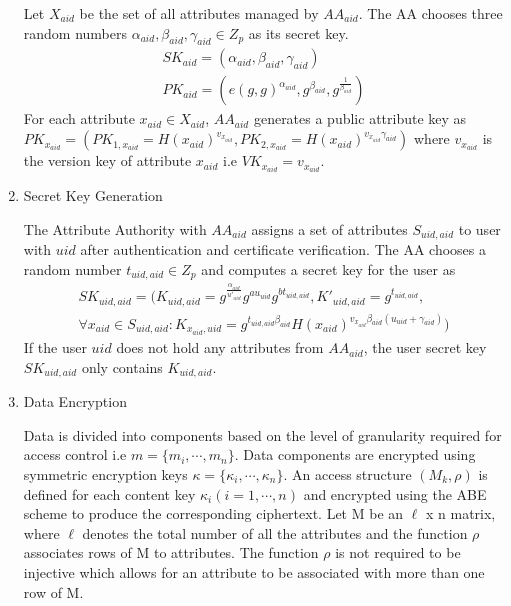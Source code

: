 \begin{enumerate}
	Let $ X_{aid} $ be the set of all attributes managed by $ AA_{aid} $. The AA chooses three random numbers $ \alpha_{aid}, \beta_{aid}, \gamma_{aid} \in Z_{p} $ as its secret key.
	\begin{align*}
		SK_{aid} = (\alpha_{aid}, \beta_{aid}, \gamma_{aid}) \\
		PK_{aid} = (e(g, g)^{\alpha_{aid}}, g^{\beta_{aid}}, g^{\frac{1}{\beta_{aid}}})
	\end{align*}
	For each attribute $ x_{aid} \in X_{aid} $, $ AA_{aid} $ generates a public attribute key as $ PK_{x_{aid}} = (PK_{1, x_{aid}} = H(x_{aid})^{v_{x_{aid}}}, PK_{2, x_{aid}} = H(x_{aid})^{v_{x_{aid}}\gamma_{aid}}) $ where $ v_{x_{aid}} $ is the version key of attribute $ x_{aid} $ i.e $ VK_{x_{aid}} = v_{x_{aid}} $.
	
	\item Secret Key Generation
	
	The Attribute Authority with $ AA_{aid} $ assigns a set of attributes $ S_{uid,aid} $ to user with $ uid $ after authentication and certificate verification. The AA chooses a random number $ t_{uid,aid} \in Z_{p} $ and computes a secret key for the user as
	\begin{align*}
		SK_{uid,aid} = (K_{uid,aid} = g^{\frac{\alpha_{aid}}{u'_{uid}}}g^{au_{uid}}g^{bt_{uid,aid}}, K'_{uid,aid} = g^{t_{uid,aid}}, \\
		\forall x_{aid} \in S_{uid,aid} \colon K_{x_{aid},uid} = g^{t_{uid,aid}\beta_{aid}}H(x_{aid})^{v_{x_{aid}}\beta_{aid}(u_{uid} + \gamma_{aid})})
	\end{align*}
	If the user $ uid $ does not hold any attributes from $ AA_{aid} $, the user secret key $ SK_{uid,aid} $ only contains $ K_{uid,aid} $.
	
	\item Data Encryption
	
	Data is divided into components based on the level of granularity required for access control i.e $ m = \{m_{i}, \cdots, m_{n}\} $. Data components are encrypted using symmetric encryption keys $ \kappa = \{\kappa_{i}, \cdots, \kappa_{n}\} $. An access structure $ (M_{k}, \rho) $ is defined for each content key $ \kappa_{i} (i = 1, \cdots, n) $ and encrypted using the ABE scheme to produce the corresponding ciphertext. Let M be an $\ell$ x n matrix, where $\ell$ denotes the total number of all the attributes and the function $ \rho $ associates rows of M to attributes. The function $\rho$ is not required to be injective which allows for an attribute to be associated with more than one row of M.
	

\end{enumerate}
